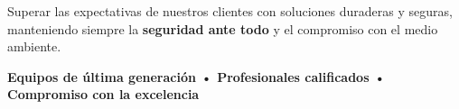 \documentclass[a4paper,11pt]{article}
\begin{document}
{{\begin{center}
\begin{minipage}{18cm}
            \vspace{0.5cm}
            
            {\large Superar las expectativas de nuestros clientes con soluciones duraderas y seguras, manteniendo siempre la \textbf{seguridad ante todo} y el compromiso con el medio ambiente.}
            
            \vspace{1cm}
            
            \colorbox{grisClaro}{\parbox{17cm}{
                \vspace{0.4cm}
                \centering
                \Large\textbf{Equipos de última generación • Profesionales calificados • Compromiso con la excelencia}
                \vspace{0.4cm}
            }}
        \end{minipage}
    \end{center}
    
    \vspace{2cm}
}}
\end{document}
